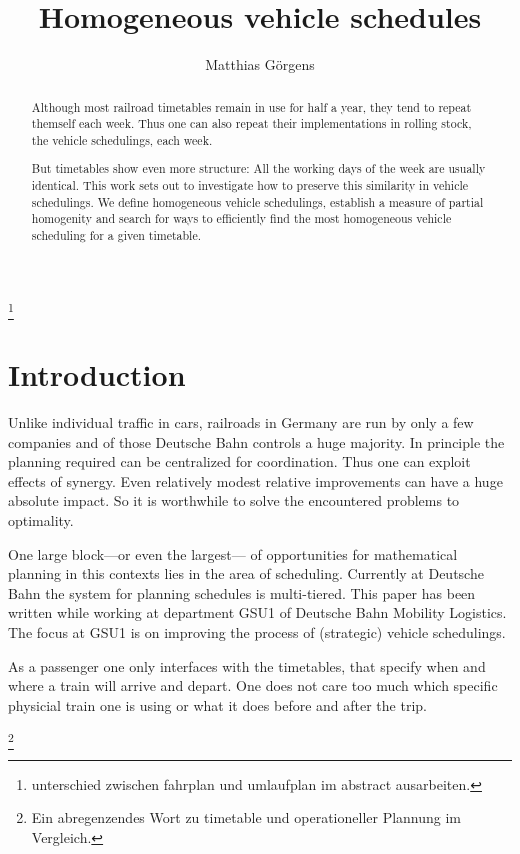 \documentclass[a4paper]{amsart} %
\author{Matthias Görgens}
\newcommand{\todo}[1]{\footnote{#1}}
\begin{document}
\title{Homogeneous vehicle schedules}



\begin{abstract}
  Although most railroad timetables remain in use for half a
  year, they tend to repeat themself each week.  Thus one can also
  repeat their implementations in rolling stock, the vehicle
  schedulings, each week.

  But timetables show even more structure: All the working days of the
  week are usually identical.  This work sets out to investigate how
  to preserve this similarity in vehicle schedulings.  We define
  homogeneous vehicle schedulings, establish a measure of partial
  homogenity and search for ways to efficiently find the most
  homogeneous vehicle scheduling for a given timetable.
\end{abstract}

\maketitle
\todo{unterschied zwischen fahrplan und umlaufplan im abstract ausarbeiten.}

\section{Introduction}
Unlike individual traffic in cars, railroads in Germany are run by
only a few companies and of those Deutsche Bahn controls a huge
majority.  In principle the planning required can be centralized for
coordination.  Thus one can exploit effects of synergy.  Even
relatively modest relative improvements can have a huge absolute
impact.  So it is worthwhile to solve the encountered problems to
optimality.

One large block---or even the largest--- of opportunities for
mathematical planning in this contexts lies in the area of scheduling.
Currently at Deutsche Bahn the system for planning schedules is
multi-tiered.  This paper has been written while working at department
GSU1 of Deutsche Bahn Mobility Logistics.  The focus at GSU1 is on
improving the process of (strategic) vehicle schedulings.

As a passenger one only interfaces with the timetables, that specify
when and where a train will arrive and depart.  One does not care too
much which specific physicial train one is using or what it does
before and after the trip.

\todo{Ein abregenzendes Wort zu timetable und operationeller Plannung
  im Vergleich.}
\end{document}
